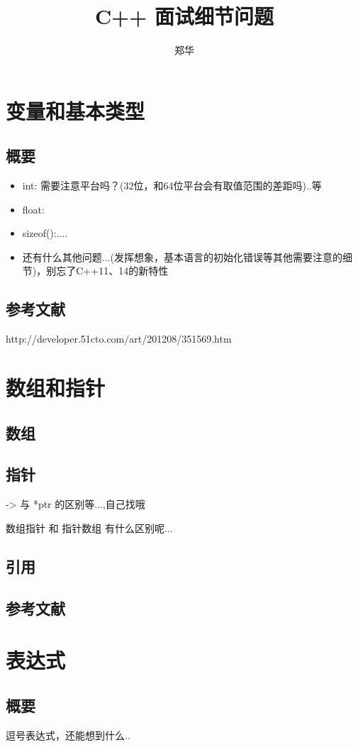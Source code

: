 \documentclass[UTF8,a4paper,12pt]{ctexart}
\author{\kaishu 郑华}
\title{\heiti C++ 面试细节问题}
\begin{document}
 	\maketitle
  
 \section{变量和基本类型}
	 \subsection{概要}
	 \begin{itemize}
	 	\item int: 需要注意平台吗？(32位，和64位平台会有取值范围的差距吗)..等
	 	\item float:
	 	\item sizeof():....
	 	\item 还有什么其他问题...(发挥想象，基本语言的初始化错误等其他需要注意的细节)，别忘了C++11、14的新特性
	 \end{itemize}
	\subsection{参考文献}http://developer.51cto.com/art/201208/351569.htm
\section{数组和指针}	
	\subsection{数组}
	\subsection{指针}
		-> 与 *ptr 的区别等...,自己找哦
		
		数组指针 和 指针数组 有什么区别呢...
	\subsection{引用}
	\subsection{参考文献}	

\section{表达式}
	\subsection{概要}
	逗号表达式，还能想到什么..
\end{document}
